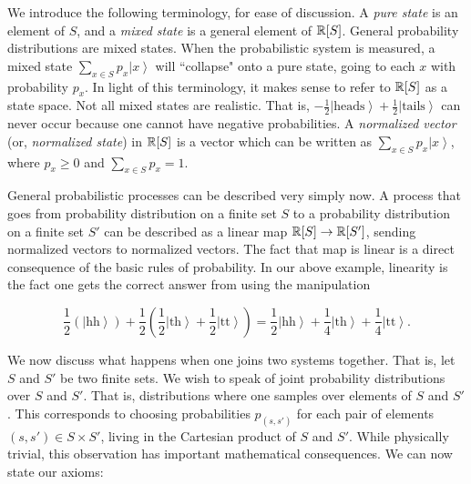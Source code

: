 \documentclass{article}
\theoremstyle{definition}
\numberwithin{figure}{section}
\begin{document}
We introduce the following terminology, for ease of discussion. A \textit{pure state} is an element of $S$, and a \textit{mixed state} is a general element of $\mathbb{R}[S]$. General probability distributions are mixed states. When the probabilistic system is measured, a mixed state $\sum_{x\in S}p_x\left| x\right>$ will ``collapse" onto a pure state, going to each $x$ with probability $p_x$. In light of this terminology, it makes sense to refer to $\mathbb{R}[S]$ as a state space. Not all mixed states are realistic. That is, $-\frac{1}{2}\left|\text{heads}\right>+\frac{1}{2}\left|\text{tails}\right>$ can never occur because one cannot have negative probabilities. A \textit{normalized vector} (or, \textit{normalized state}) in $\mathbb{R}[S]$ is a vector which can be written as $\sum_{x\in S}p_x \left |x \right>$, where $p_x\geq 0$ and $\sum_{x\in S}p_x=1$.

General probabilistic processes can be described very simply now. A process that goes from probability distribution on a finite set $S$ to a probability distribution on a finite set $S'$ can be described as a linear map $\mathbb{R}[S]\to \mathbb{R}[S']$, sending normalized vectors to normalized vectors. The fact that map is linear is a direct consequence of the basic rules of probability. In our above example, linearity is the fact one gets the correct answer from using the manipulation


$$\frac{1}{2}\left(\left|\text{hh}\right>\right)+\frac{1}{2}\left(\frac{1}{2}\left|\text{th}\right>+\frac{1}{2}\left|\text{tt}\right>\right)=\frac{1}{2}\left|\text{hh}\right>+\frac{1}{4}\left|\text{th}\right>+\frac{1}{4}\left|\text{tt}\right>.$$

We now discuss what happens when one joins two systems together. That is, let $S$ and $S'$ be two finite sets. We wish to speak of joint probability distributions over $S$ and $S'$. That is, distributions where one samples over elements of $S$ and $S'$. This corresponds to choosing probabilities $p_{(s,s')}$ for each pair of elements $(s,s')\in S\times S'$, living in the Cartesian product of $S$ and $S'$. While physically trivial, this observation has important mathematical consequences. We can now state our axioms:
\end{document}
